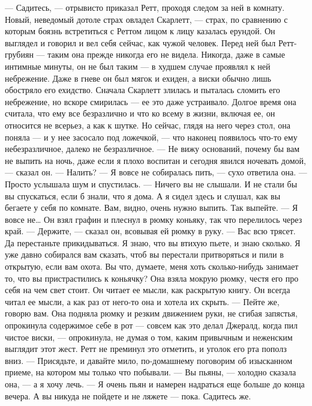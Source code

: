 — Садитесь, — отрывисто приказал Ретт, проходя следом за ней в комнату.
Новый, неведомый дотоле страх овладел Скарлетт, — страх, по сравнению с которым боязнь встретиться с Реттом лицом к лицу казалась ерундой. Он выглядел и говорил и вел себя сейчас, как чужой человек. Перед ней был Ретт-грубиян — таким она прежде никогда его не видела. Никогда, даже в самые интимные минуты, он не был таким — в худшем случае проявлял к ней небрежение. Даже в гневе он был мягок и ехиден, а виски обычно лишь обостряло его ехидство. Сначала Скарлетт злилась и пыталась сломить его небрежение, но вскоре смирилась — ее это даже устраивало. Долгое время она считала, что ему все безразлично и что ко всему в жизни, включая ее, он относится не всерьез, а как к шутке. Но сейчас, глядя на него через стол, она поняла — и у нее засосало под ложечкой, — что наконец появилось что-то ему небезразличное, далеко не безразличное.
— Не вижу оснований, почему бы вам не выпить на ночь, даже если я плохо воспитан и сегодня явился ночевать домой, — сказал он. — Налить?
— Я вовсе не собиралась пить, — сухо ответила она. — Просто услышала шум и спустилась.
— Ничего вы не слышали. И не стали бы вы спускаться, если б знали, что я дома. А я сидел здесь и слушал, как вы бегаете у себя по комнате. Вам, видно, очень нужно выпить. Так выпейте.
— Я вовсе не…
Он взял графин и плеснул в рюмку коньяку, так что перелилось через край.
— Держите, — сказал он, всовывая ей рюмку в руку. — Вас всю трясет. Да перестаньте прикидываться. Я знаю, что вы втихую пьете, и знаю сколько. Я уже давно собирался вам сказать, чтоб вы перестали притворяться и пили в открытую, если вам охота. Вы что, думаете, меня хоть сколько-нибудь занимает то, что вы пристрастились к коньячку?
Она взяла мокрую рюмку, честя его про себя на чем свет стоит. Он читает ее мысли, как раскрытую книгу. Он всегда читал ее мысли, а как раз от него-то она и хотела их скрыть.
— Пейте же, говорю вам.
Она подняла рюмку и резким движением руки, не сгибая запястья, опрокинула содержимое себе в рот — совсем как это делал Джералд, когда пил чистое виски, — опрокинула, не думая о том, каким привычным и неженским выглядит этот жест. Ретт не преминул это отметить, и уголок его рта пополз вниз.
— Присядьте, и давайте мило, по-домашнему поговорим об изысканном приеме, на котором мы только что побывали.
— Вы пьяны, — холодно сказала она, — а я хочу лечь.
— Я очень пьян и намерен надраться еще больше до конца вечера. А вы никуда не пойдете и не ляжете — пока. Садитесь же.
